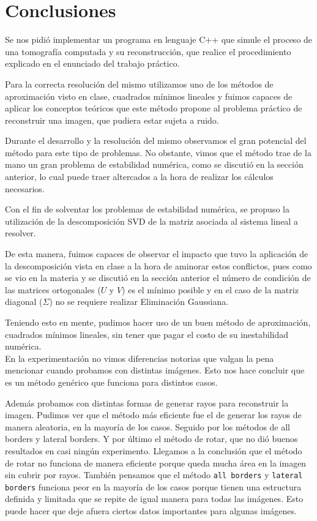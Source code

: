 \section{Conclusiones}
\label{sec:conclusiones}

Se nos pidió implementar un programa en lenguaje C++ que simule el proceso de una tomografía computada y su reconstrucción, que realice el procedimiento explicado en el enunciado del trabajo práctico.


Para la correcta resolución del mismo utilizamos uno de los métodos de aproximación visto en clase, cuadrados mínimos lineales y fuimos capaces de aplicar los conceptos teóricos que este método propone al problema práctico de reconstruir una imagen, que pudiera estar sujeta a ruido.


Durante el desarrollo y la resolución del mismo observamos el gran potencial del método para este tipo de problemas. No obstante, vimos que el método trae de la mano un gran problema de estabilidad numérica, como se discutió en la sección anterior, lo cual puede traer altercados a la hora de realizar los cálculos necesarios.


Con el fin de solventar los problemas de estabilidad numérica, se propuso la utilización de la descomposición SVD de la matriz asociada al sistema lineal a resolver. 


De esta manera, fuimos capaces de observar el impacto que tuvo la aplicación de la descomposición vista en clase a la hora de aminorar estos conflictos, pues como se vio en la materia y se discutió en la sección anterior el número de condición de las matrices ortogonales ($U$ y $V$) es el mínimo posible y en el caso de la matriz diagonal ($\Sigma$) no se requiere realizar Eliminación Gaussiana.


Teniendo esto en mente, pudimos hacer uso de un buen método de aproximación, cuadrados mínimos lineales, sin tener que pagar el costo de su inestabilidad numérica.\\

En la experimentación no vimos diferencias notorias que valgan la pena mencionar cuando probamos con distintas imágenes. Esto nos hace concluir que es un método genérico que funciona para distintos casos.

Además probamos con distintas formas de generar rayos para reconstruir la imagen. Pudimos ver que el método más
eficiente fue el de generar los rayos de manera aleatoria, en la mayoría de los casos. Seguido por los métodos de
all borders y lateral borders. Y por último el método de rotar, que no dió buenos resultados en casi ningún experimento.
Llegamos a la conclusión que el método de rotar no funciona de manera eficiente porque queda mucha área en la imagen sin 
cubrir por rayos. También pensamos que el método \verb|all borders| y \verb|lateral borders| funciona peor en la mayoría de 
los casos porque tienen una estructura definida y limitada que se repite de igual manera para todas las imágenes. 
Esto puede hacer que deje afuera ciertos datos importantes para algunas imágenes.

